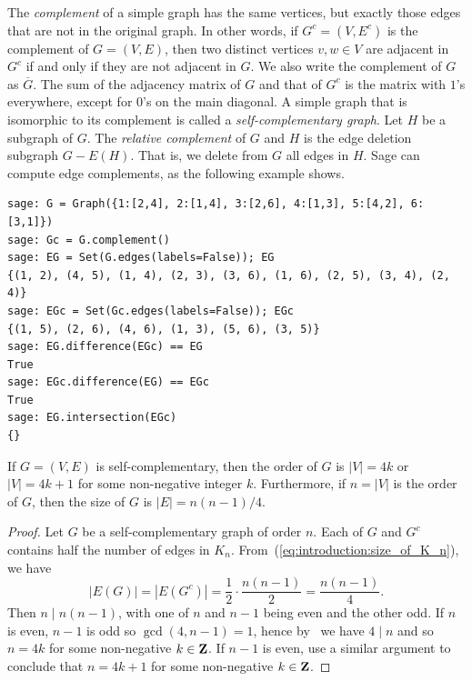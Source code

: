 The \emph{complement} of a simple graph has the same
vertices, but
exactly those edges that are not in the original graph. In other
words, if $G^c = (V, E^c)$ is the complement of
$G = (V,E)$, then two distinct vertices $v,w \in V$ are adjacent in
$G^c$ if and only if they are not adjacent in $G$. We also write the
complement of $G$ as $\overline{G}$. The sum of
the adjacency matrix of $G$ and that of $G^c$ is the matrix with $1$'s
everywhere, except for $0$'s on the main diagonal. A simple graph that
is isomorphic to its complement is called a
\emph{self-complementary graph}. Let
$H$ be a subgraph of $G$. The
\emph{relative complement} of $G$ and $H$
is the edge deletion subgraph $G - E(H)$. That is, we delete from $G$
all edges in $H$. Sage can compute edge complements, as the following
example shows.
%
\begin{lstlisting}
sage: G = Graph({1:[2,4], 2:[1,4], 3:[2,6], 4:[1,3], 5:[4,2], 6:[3,1]})
sage: Gc = G.complement()
sage: EG = Set(G.edges(labels=False)); EG
{(1, 2), (4, 5), (1, 4), (2, 3), (3, 6), (1, 6), (2, 5), (3, 4), (2, 4)}
sage: EGc = Set(Gc.edges(labels=False)); EGc
{(1, 5), (2, 6), (4, 6), (1, 3), (5, 6), (3, 5)}
sage: EG.difference(EGc) == EG
True
sage: EGc.difference(EG) == EGc
True
sage: EG.intersection(EGc)
{}
\end{lstlisting}

\begin{theorem}
If $G = (V, E)$ is self-complementary, then the order of $G$ is
$|V| = 4k$ or $|V| = 4k + 1$ for some non-negative integer
$k$. Furthermore, if $n = |V|$ is the order of $G$, then the size of
$G$ is $|E| = n(n - 1) / 4$.
\end{theorem}

\begin{proof}
Let $G$ be a self-complementary graph of order $n$. Each of $G$ and
$G^c$ contains half the number of edges in
$K_n$. From~(\ref{eq:introduction:size_of_K_n}), we have
\[
|E(G)|
=
|E(G^c)|
=
\frac{1}{2} \cdot \frac{n(n - 1)}{2}
=
\frac{n(n - 1)}{4}.
\]
Then $n \;|\; n(n - 1)$, with one of $n$ and $n - 1$ being even and
the other odd. If $n$ is even, $n - 1$ is odd so $\gcd(4, n-1) = 1$,
hence by~\cite[Theorem~1.9]{Shoup2008} we have $4 \;|\; n$ and so
$n = 4k$ for some non-negative $k \in \mathbf{Z}$. If $n - 1$ is even, use a
similar argument to conclude that $n = 4k + 1$ for some non-negative
$k \in \mathbf{Z}$.
\end{proof}

